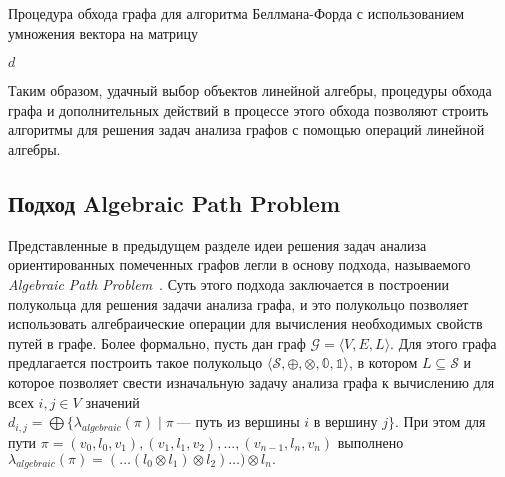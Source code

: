 \begin{algorithm}
\begin{algorithmic}[1]
\caption{Процедура обхода графа для алгоритма Беллмана-Форда с использованием умножения вектора на матрицу}
\label{lst:bford2}
    \EndFor
        \State \Return {}
    \EndIf
    \State \Return $d$
\EndFunction
\end{algorithmic}
\end{algorithm}

Таким образом,  удачный выбор объектов линейной алгебры, процедуры обхода графа и дополнительных действий в процессе этого обхода позволяют строить алгоритмы для решения задач анализа графов с помощью операций  линейной алгебры.  

\subsection{Подход Algebraic Path Problem} Представленные в предыдущем разделе идеи решения задач анализа ориентированных помеченных графов легли в основу подхода, называемого \textit{Algebraic Path Problem}~\cite{rote1990path}. Суть этого подхода заключается в построении полукольца для решения задачи анализа графа, и это полукольцо  позволяет использовать алгебраические операции для вычисления необходимых свойств путей в графе. Более формально, пусть дан граф $\mathcal{G} = \langle V, E, L \rangle$. Для этого графа предлагается построить такое полукольцо $\langle \mathcal{S}, \oplus, \otimes, \mathbb{0}, \mathbb{1} \rangle$, в котором  $L \subseteq \mathcal{S}$ и которое позволяет свести изначальную задачу анализа графа к вычислению для всех $i, j \in V$ значений $d_{i,j} = \bigoplus \{\lambda_{algebraic}(\pi) \mid \pi~\text{--- путь из вершины $i$ в вершину $j$}\}$. При этом для пути $\pi = (v_0, l_0, v_1), (v_1, l_1, v_2), \ldots, (v_{n - 1}, l_n, v_n)$ выполнено $\lambda_{algebraic}(\pi) = (\ldots (l_0 \otimes l_1) \otimes l_2) \ldots ) \otimes l_n.$


